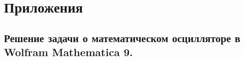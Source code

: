 \documentclass[a4paper,14pt]{article}
\begin{document}

\tableofcontents
\newpage











\newpage
\section{Приложения}
\subsection{Решение задачи о математическом осцилляторе в Wolfram Mathematica 9.}
\label{Wolfram}

\end{document}
